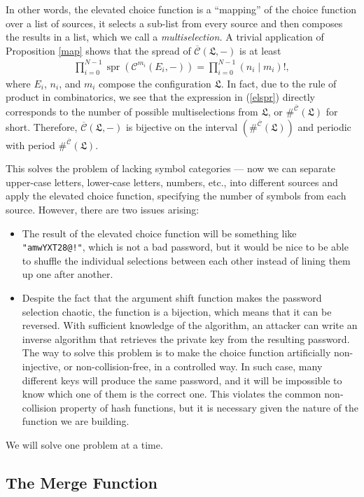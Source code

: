 \documentclass[a4paper, 10pt]{article}
\theoremstyle{plain}
\theoremstyle{definition}
\newcommand{\rf}[2]{(#1 \mathbin{\mid} #2)!}
\newcommand{\spr}[1]{\operatorname{spr}(#1)}
\newcommand{\cc}{\mathcal{C}}
\newcommand{\conf}{\mathfrak{L}}
\newcommand{\elv}{\overline{\mathcal{C}}}
\begin{document}
In other words, the elevated choice function is a ``mapping'' of the choice function over a list of sources, it selects a sub-list from every source and then composes the results in a list, which we call a \emph{multiselection.} A trivial application of Proposition \ref{map} shows that the spread of $\elv(\conf, -)$ is at least
\begin{align}
  \label{elspr}
  \prod_{i = 0}^{N-1} \spr{\cc^{m_i}(E_i, -)} = \prod_{i = 0}^{N-1} \rf{n_i}{m_i},
\end{align}
where $E_i$, $n_i$, and $m_i$ compose the configuration $\conf$. In fact, due to the rule of product in combinatorics, we see that the expression in (\ref{elspr}) directly corresponds to the number of possible multiselections from $\conf$, or $\#^{\elv} (\conf)$ for short. Therefore, $\elv(\conf, -)$ is bijective on the interval $\left( \#^{\elv} (\conf) \right)$ and periodic with period $\#^{\elv} (\conf)$.

This solves the problem of lacking symbol categories --- now we can separate upper-case letters, lower-case letters, numbers, etc., into different sources and apply the elevated choice function, specifying the number of symbols from each source. However, there are two issues arising:

\begin{itemize}
  \item The result of the elevated choice function will be something like \texttt{"amwYXT28@!"}, which is not a bad password, but it would be nice to be able to shuffle the individual selections between each other instead of lining them up one after another.
  \item Despite the fact that the argument shift function makes the password selection chaotic, the function is a bijection, which means that it can be reversed. With sufficient knowledge of the algorithm, an attacker can write an inverse algorithm that retrieves the private key from the resulting password. The way to solve this problem is to make the choice function artificially non-injective, or non-collision-free, in a controlled way. In such case, many different keys will produce the same password, and it will be impossible to know which one of them is the correct one. This violates the common non-collision property of hash functions, but it is necessary given the nature of the function we are building.
\end{itemize}

We will solve one problem at a time.

\subsection{The Merge Function}
\end{document}
